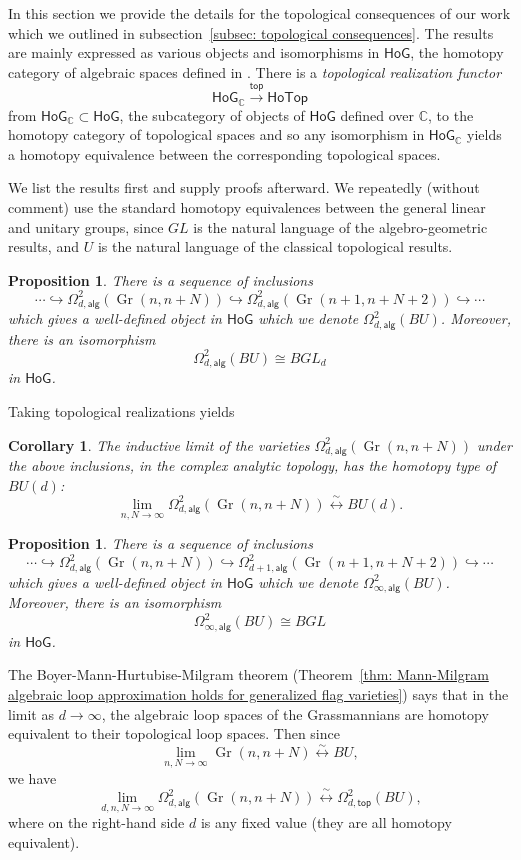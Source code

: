 \documentclass{amsart}
\newtheorem{proposition}[theorem]{Proposition}
\newtheorem{corollary}[theorem]{Corollary}
\theoremstyle{definition}
\newcommand{\CC} {{\mathbb C}}          %
\newcommand{\HoG}{\textsf{HoG}}
\newcommand{\HoTop}{\textsf{HoTop}}
\newcommand{\alg}{\mathsf{alg}}
\renewcommand{\top}{\mathsf{top}}
\newcommand{\Gr}{\operatorname{Gr}}
\newcommand{\LoopTwo}{\Omega^{2}_{d,\alg}}
\newcommand{\LoopTwoTop}{\Omega^{2}_{d,\top}}
\newcommand{\homotopyeq}{\overset \sim \longleftrightarrow}
\begin{document}
In this section we provide the details for the topological
consequences of our work which we outlined in subsection~\ref{subsec:
topological consequences}. The results are mainly expressed as various
objects and isomorphisms in $\HoG$, the homotopy category of algebraic
spaces defined in \cite{Larson-Vakil-BottPeriodicity}. There is a
\emph{topological realization functor} 
\[
\HoG_{\CC } \xrightarrow{\top } \HoTop
\] 
from $\HoG_{\CC }\subset \HoG$, the subcategory of objects of $\HoG$ defined
over $\CC$,  to the homotopy category of topological spaces and so any
isomorphism in $\HoG_{\CC}$ yields a homotopy equivalence between the
corresponding topological spaces.

We list the results first and supply proofs afterward. We repeatedly (without comment) use the
standard homotopy equivalences between the general linear and unitary groups, since $GL$
is the natural language of the algebro-geometric results, and $U$ is the natural language
of the classical topological results.


\begin{proposition}\label{prop: Loop2(BU)=BGLd in HoG}
There is a sequence of inclusions
\[
\dotsb \hookrightarrow \LoopTwo (\Gr (n,n+N))\hookrightarrow \LoopTwo
(\Gr (n+1,n+N+2))\hookrightarrow \dotsb
\]
which gives a well-defined object in $\HoG$ which we denote $\LoopTwo
(BU)$. Moreover, there is an isomorphism
\[
\LoopTwo (BU)\cong BGL_{d}
\]
in $\HoG$. 
\end{proposition}

Taking topological realizations yields

\begin{corollary}
The inductive limit of the varieties $\LoopTwo (\Gr (n,n+N))$ under
the above inclusions, in the complex analytic topology, has the
homotopy type of $BU(d)$:
\[
\lim_{n,N\to \infty} \LoopTwo (\Gr (n,n+N)) \homotopyeq BU(d).
\]
\end{corollary}

\begin{proposition}\label{prop: Loop2inft(BU)=BGL in HoG}
There is a sequence of inclusions 
\[
\dotsb \hookrightarrow \LoopTwo (\Gr (n,n+N))
\hookrightarrow \Omega^{2}_{d+1,\alg} (\Gr (n+1,n+N+2)) \hookrightarrow \dotsb 
\]
which gives a well-defined object in $\HoG$ which we denote
$\Omega^{2}_{\infty ,\alg}(BU)$. Moreover, there is an isomorphism
\[
\Omega^{2}_{\infty ,\alg}(BU)\cong BGL
\]
in $\HoG$. 
\end{proposition}

The Boyer-Mann-Hurtubise-Milgram theorem
(Theorem~\ref{thm: Mann-Milgram algebraic loop approximation
holds for generalized flag varieties})
says that in the limit as $d\to \infty$, the
algebraic loop spaces of the Grassmannians are homotopy equivalent to
their topological loop spaces. Then since
\[
\lim_{n,N\to \infty} \Gr (n,n+N) \homotopyeq  BU,
\]
we have
\[
\lim_{d,n,N\to \infty} \LoopTwo (\Gr (n,n+N)) \homotopyeq \LoopTwoTop (BU), 
\]
where on the right-hand side $d$ is any fixed value (they are all
homotopy equivalent). 
\end{document}
